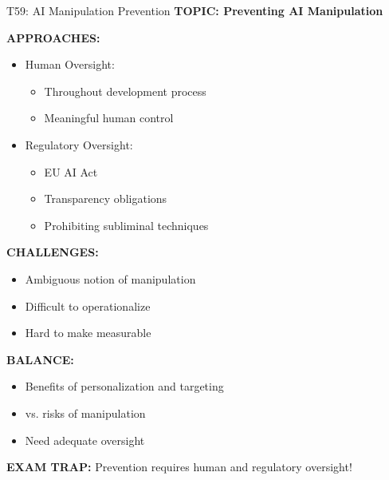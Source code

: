 \documentclass[8pt]{beamer}
\begin{document}
	\begin{frame}{T59: AI Manipulation Prevention}
		\fontsize{6.5}{7.5}\selectfont
		\textbf{TOPIC: Preventing AI Manipulation}
		
		\vspace{0.1cm}
		\textbf{APPROACHES:}
		\begin{itemize}
			\item \textcolor{myblue}{Human Oversight:}
			\begin{itemize}
				\item Throughout development process
				\item Meaningful human control
			\end{itemize}
			\item \textcolor{myblue}{Regulatory Oversight:}
			\begin{itemize}
				\item EU AI Act
				\item Transparency obligations
				\item Prohibiting subliminal techniques
			\end{itemize}
		\end{itemize}
		
		\vspace{0.1cm}
		\textbf{CHALLENGES:}
		\begin{itemize}
			\item Ambiguous notion of manipulation
			\item Difficult to operationalize
			\item Hard to make measurable
		\end{itemize}
		
		\vspace{0.1cm}
		\textbf{BALANCE:}
		\begin{itemize}
			\item Benefits of personalization and targeting
			\item vs. risks of manipulation
			\item Need adequate oversight
		\end{itemize}
		
		\textcolor{myred}{\textbf{EXAM TRAP:}} Prevention requires \textcolor{myblue}{human and regulatory oversight}!
	\end{frame}
	
	
\end{document}
